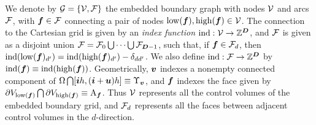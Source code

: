 \documentclass[12pt]{article}
\newcommand{\ind}{{\rm{ind}}}
\newcommand{\low}{{\rm{low}}}
\newcommand{\high}{{\rm{high}}}
\newcommand{\vol}[1]{{\Upsilon_{#1}}}
\newcommand{\area}[1]{{\rm{A}_{#1}}}
\newcommand{\vof}{{\mbf{v}}}
\newcommand{\face}{{\mbf{f}}}
\begin{document}
We denote by ${\mathcal{G}} = \{ {\mathcal{V}},{\mathcal{F}} \}$ the embedded boundary graph with nodes ${\mathcal{V}}$ and arcs ${\mathcal{F}}$, with ${\boldsymbol{f}} \in {\mathcal{F}}$ connecting a pair of nodes
$ \low (\mbf{f}) , \high(\mbf{f})  \in \mcl{V}$. The connection to the Cartesian grid is given by an {\it index function} $\ind : \mcl{V} \rightarrow \mbb{Z}^\DIM$, and ${\mathcal{F}}$ is given as a disjoint union ${\mathcal{F}} = {\mathcal{F}}_0 \bigcup \dots \bigcup {\mathcal{F}}_{{\boldsymbol{D}}-1}$, such that, if ${\boldsymbol{f}} \in {\mathcal{F}}_d$, then $\ind (\low (\mbf{f} )_{d'} ) = \ind (\high (\mbf{f} )_{d'} ) - \delta_{d d'}$. We also define $\ind : \mcl{F} \rightarrow \mbb{Z}^\DIM$ by $\ind (\face) \equiv \ind(\high(\face))$. Geometrically, ${\boldsymbol{v}}$ indexes a nonempty connected component of $\Omega \bigcap [ \mbf{i} h,(\mbf{i} + \mbf{u}) h] \equiv \vol{\vof}$, and ${\boldsymbol{f}}$ indexes the face given by $\partial V_{\low(\mbf{f})} \bigcap \partial V_{\high(\mbf{f})} \equiv \area{\face}$. Thus ${\mathcal{V}}$ represents all the control volumes of the embedded boundary grid, and ${\mathcal{F}}_d$ represents all the faces between adjacent control volumes in the $d$-direction.
\end{document}
